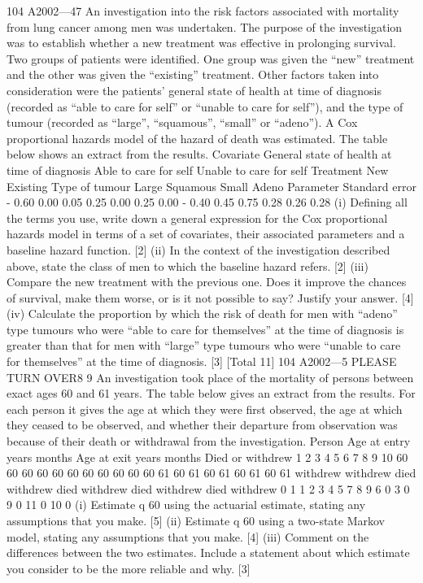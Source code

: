 \documentclass[a4paper,12pt]{article}
\begin{document}
\begin{enumerate}

104 A2002—47
An investigation into the risk factors associated with mortality from lung cancer
among men was undertaken. The purpose of the investigation was to establish
whether a new treatment was effective in prolonging survival. Two groups of patients
were identified. One group was given the “new” treatment and the other was given
the “existing” treatment. Other factors taken into consideration were the patients’
general state of health at time of diagnosis (recorded as “able to care for self” or
“unable to care for self”), and the type of tumour (recorded as “large”, “squamous”,
“small” or “adeno”).
A Cox proportional hazards model of the hazard of death was estimated. The table
below shows an extract from the results.
Covariate
General state of health at time of diagnosis
Able to care for self
Unable to care for self
Treatment
New
Existing
Type of tumour
Large
Squamous
Small
Adeno
Parameter Standard error
- 0.60
0.00 0.05
0.25
0.00 0.25
0.00
- 0.40
0.45
0.75
0.28
0.26
0.28
(i) Defining all the terms you use, write down a general expression for the Cox
proportional hazards model in terms of a set of covariates, their associated
parameters and a baseline hazard function.
[2]
(ii) In the context of the investigation described above, state the class of men to
which the baseline hazard refers.
[2]
(iii) Compare the new treatment with the previous one. Does it improve the
chances of survival, make them worse, or is it not possible to say? Justify
your answer.
[4]
(iv) Calculate the proportion by which the risk of death for men with “adeno” type
tumours who were “able to care for themselves” at the time of diagnosis is
greater than that for men with “large” type tumours who were “unable to care
for themselves” at the time of diagnosis.
[3]
[Total 11]
104 A2002—5
PLEASE TURN OVER8
9
An investigation took place of the mortality of persons between exact ages 60 and 61
years. The table below gives an extract from the results. For each person it gives the
age at which they were first observed, the age at which they ceased to be observed,
and whether their departure from observation was because of their death or
withdrawal from the investigation.
Person Age at entry
years months Age at exit
years months Died or withdrew
1
2
3
4
5
6
7
8
9
10 60
60
60
60
60
60
60
60
60
60 60
61
60
61
60
61
60
61
60
61 withdrew
withdrew
died
withdrew
died
withdrew
died
withdrew
died
withdrew
0
1
1
2
3
4
5
7
8
9
6
0
3
0
9
0
11
0
10
0
(i) Estimate q 60 using the actuarial estimate, stating any assumptions that you
make.
[5]
(ii) Estimate q 60 using a two-state Markov model, stating any assumptions that
you make.
[4]
(iii) Comment on the differences between the two estimates. Include a statement
about which estimate you consider to be the more reliable and why.
[3]


\end{enumerate}
\end{document}
